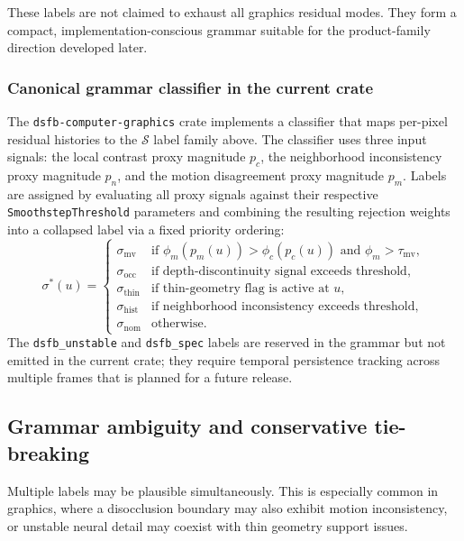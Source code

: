 \documentclass[11pt,letterpaper]{article}
\theoremstyle{gcresult}
\theoremstyle{definition}
\begin{document}
These labels are not claimed to exhaust all graphics residual modes. They form a compact, implementation-conscious grammar suitable for the product-family direction developed later.

\subsubsection{Canonical grammar classifier in the current crate}
\label{sec:grammar-classifier}

The \texttt{dsfb-computer-graphics} crate implements a classifier that maps per-pixel residual histories to the $\mathcal{S}$ label family above. The classifier uses three input signals: the local contrast proxy magnitude $p_c$, the neighborhood inconsistency proxy magnitude $p_n$, and the motion disagreement proxy magnitude $p_m$. Labels are assigned by evaluating all proxy signals against their respective \texttt{SmoothstepThreshold} parameters and combining the resulting rejection weights into a collapsed label via a fixed priority ordering:
\begin{equation}
\sigma^*(u) = \begin{cases}
  \sigma_{\mathrm{mv}} & \text{if } \phi_m(p_m(u)) > \phi_c(p_c(u)) \text{ and } \phi_m > \tau_{\mathrm{mv}}, \\
  \sigma_{\mathrm{occ}} & \text{if depth-discontinuity signal exceeds threshold}, \\
  \sigma_{\mathrm{thin}} & \text{if thin-geometry flag is active at } u, \\
  \sigma_{\mathrm{hist}} & \text{if neighborhood inconsistency exceeds threshold}, \\
  \sigma_{\mathrm{nom}} & \text{otherwise}.
\end{cases}
\end{equation}
The \texttt{dsfb\_unstable} and \texttt{dsfb\_spec} labels are reserved in the grammar but not emitted in the current crate; they require temporal persistence tracking across multiple frames that is planned for a future release.


\subsection{Grammar ambiguity and conservative tie-breaking}

Multiple labels may be plausible simultaneously. This is especially common in graphics, where a disocclusion boundary may also exhibit motion inconsistency, or unstable neural detail may coexist with thin geometry support issues.
\end{document}
